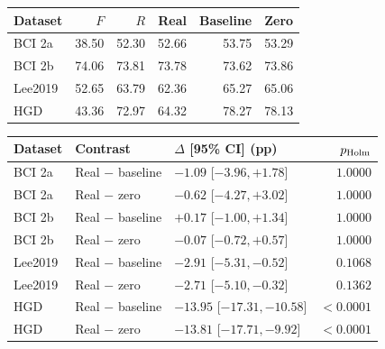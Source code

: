 \begin{tabular}{@{}lrrrrr@{}}
\toprule
Dataset & $F$ & $R$ & Real & Baseline & Zero \\
\midrule
BCI 2a & 38.50 & 52.30 & 52.66 & 53.75 & 53.29 \\
BCI 2b & 74.06 & 73.81 & 73.78 & 73.62 & 73.86 \\
Lee2019 & 52.65 & 63.79 & 62.36 & 65.27 & 65.06 \\
HGD & 43.36 & 72.97 & 64.32 & 78.27 & 78.13 \\
\bottomrule
\end{tabular}

\par\medskip
\begin{tabular}{@{}lllr@{}}
\toprule
Dataset & Contrast & $\Delta$ [95\% CI] (pp) & $p_{\rm Holm}$ \\
\midrule
BCI 2a & Real $-$ baseline & $-1.09$ [$ -3.96, +1.78 $] & $1.0000$ \\
BCI 2a & Real $-$ zero & $-0.62$ [$ -4.27, +3.02 $] & $1.0000$ \\
BCI 2b & Real $-$ baseline & $+0.17$ [$ -1.00, +1.34 $] & $1.0000$ \\
BCI 2b & Real $-$ zero & $-0.07$ [$ -0.72, +0.57 $] & $1.0000$ \\
Lee2019 & Real $-$ baseline & $-2.91$ [$ -5.31, -0.52 $] & $0.1068$ \\
Lee2019 & Real $-$ zero & $-2.71$ [$ -5.10, -0.32 $] & $0.1362$ \\
HGD & Real $-$ baseline & $-13.95$ [$ -17.31, -10.58 $] & $<0.0001$ \\
HGD & Real $-$ zero & $-13.81$ [$ -17.71, -9.92 $] & $<0.0001$ \\
\bottomrule
\end{tabular}
